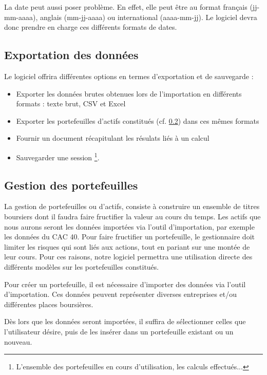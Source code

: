 		La date peut aussi poser problème. En effet, elle peut être au format français (jj-mm-aaaa), anglais (mm-jj-aaaa) ou international (aaaa-mm-jj). Le logiciel devra donc prendre en charge ces différents formats de dates.


	\subsection{Exportation des données}
		Le logiciel offrira différentes options en termes d'exportation et de sauvegarde :
		\begin{itemize}
			\item Exporter les données brutes obtenues lors de l'importation en différents formats : texte brut, CSV et Excel
			\item Exporter les portefeuilles d'actifs constitués (cf. \ref{subsubsection:portefeuilles}) dans ces mêmes formats
			\item Fournir un document récapitulant les résulats liés à un calcul
			\item Sauvegarder une session \footnote{L'ensemble des portefeuilles en cours d'utilisation, les calculs effectués...}.
		\end{itemize}


	\subsection{Gestion des portefeuilles}
	\label{subsubsection:portefeuilles}

		La gestion de portefeuilles ou d'actifs, consiste à construire un ensemble de titres boursiers dont il faudra faire fructifier la valeur au cours du temps. Les actifs que nous aurons seront les données importées via l'outil d'importation, par exemple les données du CAC 40.
		Pour faire fructifier un portefeuille, le gestionnaire doit limiter les risques qui sont liés aux actions, tout en pariant sur une montée de leur cours. Pour ces raisons, notre logiciel permettra une utilisation directe des différents modèles sur les portefeuilles constitués.


		Pour créer un portefeuille, il est nécessaire d'importer des données via l'outil d'importation. Ces données peuvent représenter diverses entreprises et/ou différentes places boursières. 

		Dès lors que les données seront importées, il suffira de sélectionner celles que l'utilisateur désire, puis de les insérer dans un portefeuille existant ou un nouveau.

